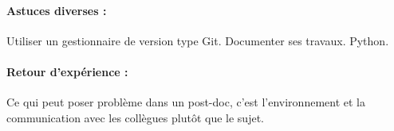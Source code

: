 \documentclass[12pt]{article}
\begin{document}
\paragraph{Astuces diverses : }Utiliser un gestionnaire de version type Git. Documenter ses travaux. Python.
\paragraph{Retour d'expérience : }Ce qui peut poser problème dans un post-doc, c'est l'environnement et la communication avec les collègues plutôt que le sujet.










\end{document}
